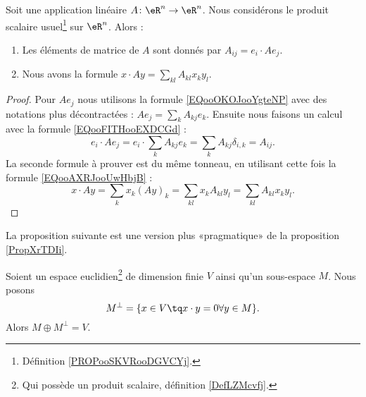\begin{proposition}     \label{PROPooZKWXooWmEzoA}
	Soit une application linéaire \( A\colon \eR^n\to \eR^n\). Nous considérons le produit scalaire usuel\footnote{Définition \ref{PROPooSKVRooDGVCYj}.} sur \( \eR^n\). Alors :
	\begin{enumerate}
		\item
		      Les éléments de matrice de \( A\) sont donnés par \( A_{ij}=e_i\cdot Ae_j\).
		\item
		      Nous avons la formule \( x\cdot Ay=\sum_{kl}A_{kl}x_ky_l \).
	\end{enumerate}
\end{proposition}

\begin{proof}
	Pour \( Ae_j\) nous utilisons la formule \ref{EQooOKOJooYgteNP} avec des notations plus décontractées : \( Ae_j=\sum_kA_{kj}e_k\). Ensuite nous faisons un calcul avec la formule \eqref{EQooFITHooEXDCGd} :
	\begin{equation}
		e_i\cdot Ae_j=e_i\cdot \sum_kA_{kj}e_k=\sum_{k}A_{kj}\delta_{i,k}=A_{ij}.
	\end{equation}
	La seconde formule à prouver est du même tonneau, en utilisant cette fois la formule \eqref{EQooAXRJooUwHbjB} :
	\begin{equation}
		x\cdot Ay=\sum_kx_k(Ay)_k=\sum_{kl}x_kA_{kl}y_l=\sum_{kl}A_{kl}x_ky_l.
	\end{equation}
\end{proof}

La proposition suivante est une version plus «pragmatique» de la proposition \ref{PropXrTDIi}.
\begin{proposition}       \label{PROPooNITTooCYcrrT}
	Soient un espace euclidien\footnote{Qui possède un produit scalaire, définition \ref{DefLZMcvfj}.} de dimension finie \( V\) ainsi qu'un sous-espace \( M\). Nous posons
	\begin{equation}
		M^{\perp}=\{ x\in V\tq x\cdot y=0\forall y\in M \}.
	\end{equation}
	Alors \( M\oplus M^{\perp}=V\).
\end{proposition}

